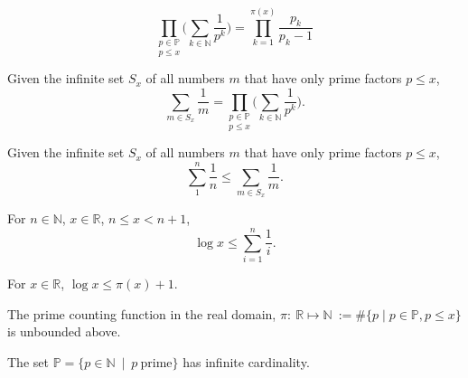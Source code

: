 \begin{lemma}
\label{lem:lemma3}
    $$\underset{p\le x}{\prod_{p\in\mathbb{P}}}\Big(\sum_{k\in\mathbb{N}}\frac{1}{p^k}\Big) = \prod_{k=1}^{\pi(x)}\frac{p_k}{p_k-1}$$
\end{lemma}

\begin{lemma}
\label{lem:lemma2}
Given the infinite set $S_x$ of all numbers $m$ that have only prime factors $p\le x$,
    $$\sum_{m\in S_x}\frac{1}{m} = \underset{p\le x}{\prod_{p\in\mathbb{P}}}\Big(\sum_{k\in\mathbb{N}}\frac{1}{p^k}\Big).$$
\end{lemma}

\begin{lemma}
\label{lem:lemma1}
Given the infinite set $S_x$ of all numbers $m$ that have only prime factors $p\le x$,
$$\sum_1^n\frac1n \le \sum_{m\in S_x}\frac{1}{m}. $$
\end{lemma}

\begin{lemma}
\label{lem:lemma0}
For $n\in\mathbb{N}$, $x\in\mathbb{R}$, $n\le x < n+1$,
$$\log x \le \sum_{i=1}^n\frac1i.$$
\end{lemma}

\begin{theorem}
\label{thm:log_le_primeCountingReal_add_one}
For $x\in\mathbb{R}$, $\log x \le \pi(x) +1$.
\end{theorem}

\begin{theorem}
\label{thm:primeCountingReal_unbounded}
The prime counting function in the real domain, $\pi:\ \mathbb{R} \mapsto \mathbb{N} \ := \#\big\{p\mid p \in\mathbb{P}, p\le x \big\}$ is unbounded above.
\end{theorem}

\begin{theorem}
\label{thm:infinite_primes}
The set $\mathbb{P} = \big\{p \in \mathbb{N} \ \mid \ p \ \mathrm{prime} \big\}$ has infinite cardinality. 
\end{theorem}

